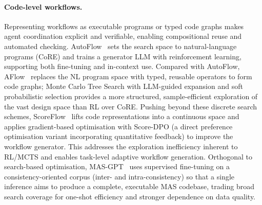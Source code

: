 \documentclass[]{selfevolagent}
\theoremstyle{plain}
\theoremstyle{definition}
\theoremstyle{remark}
\begin{document}
\paragraph{{Code-level workflows.}}
Representing workflows as executable programs or typed code graphs makes agent coordination explicit and verifiable, enabling compositional reuse and automated checking. AutoFlow~\citep{li2024autoflowautomatedworkflowgeneration} sets the search space to natural-language programs (CoRE) and trains a generator LLM with reinforcement learning, supporting both fine-tuning and in-context use. 
Compared with AutoFlow, AFlow~\citep{zhang2025aflow}  replaces the NL program space with typed, reusable operators to form code graphs; Monte Carlo Tree Search with LLM\mbox{-}guided expansion and soft probabilistic selection provides a more structured, sample\mbox{-}efficient exploration of the vast design space than RL over CoRE.
Pushing beyond these discrete search schemes, ScoreFlow~\citep{wang2025scoreflow} lifts code representations into a continuous space and applies gradient\mbox{-}based optimisation with Score\mbox{-}DPO (a direct preference optimisation variant incorporating quantitative feedback) to improve the workflow generator. This addresses the exploration inefficiency inherent to RL/MCTS and enables task\mbox{-}level adaptive workflow generation.
Orthogonal to search\mbox{-}based optimisation, MAS\mbox{-}GPT~\citep{ye2025masgpttrainingllmsbuild} uses supervised fine\mbox{-}tuning on a consistency\mbox{-}oriented corpus (inter\mbox{-} and intra\mbox{-}consistency) so that a single inference aims to produce a complete, executable MAS codebase, trading broad search coverage for one\mbox{-}shot efficiency and stronger dependence on data quality.
\end{document}
